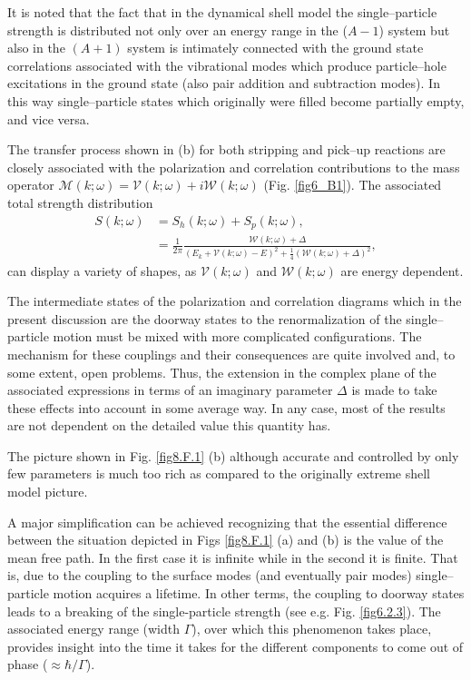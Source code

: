 It is noted that the fact that in the dynamical shell model the single--particle strength is distributed not only over an energy range in the ($A-1$) system but also in the $(A+1)$ system is intimately connected with the ground state correlations associated with the vibrational modes which produce particle--hole excitations in the ground state (also pair addition and subtraction modes). In this way single--particle states which originally were filled become partially empty, and vice versa.


The transfer process shown in (b) for both stripping and pick--up reactions are closely associated with the polarization and correlation contributions to the mass operator $\mathcal M(k;\omega)=\mathcal V(k;\omega)+i\mathcal W(k;\omega)$ (Fig. \ref{fig6_B1}). The associated total strength distribution
 \begin{align}
 \nonumber S(k;\omega)&=S_h(k;\omega)+S_p(k;\omega),\\
 &=\frac{1}{2\pi}\frac{\mathcal W(k;\omega)+\Delta}{(E_k+\mathcal V(k;\omega)-E)^2+\frac{1}{4}\left(\mathcal W(k;\omega)+\Delta\right)^2},
 \end{align}
can display a variety of shapes, as $\mathcal V(k;\omega)$ and $\mathcal W(k;\omega)$ are energy dependent.


The intermediate states of the polarization and correlation diagrams which in the present discussion are the doorway states to the renormalization of the single--particle motion must be mixed with more complicated configurations. The mechanism for these couplings and their consequences are quite involved and, to some extent, open problems. Thus, the extension in the complex plane of the associated expressions in terms of an imaginary parameter $\Delta$ is made to take these effects into account in some average way. In any case, most of the results are not dependent on the detailed value this quantity has. 


The picture shown in Fig. \ref{fig8.F.1} (b) although accurate and controlled by only few parameters is much too rich as compared to the originally extreme shell model picture.


A major simplification can be achieved recognizing that the essential difference between the situation depicted in Figs \ref{fig8.F.1} (a) and (b) is the value of the mean free path. In the first case it is infinite while in the second it is finite. That is, due to the coupling to the surface modes (and eventually pair modes) single--particle motion acquires a lifetime. In other terms, the coupling to doorway states leads to a breaking of the single-particle strength (see e.g. Fig. \ref{fig6.2.3}). The associated energy range (width $\Gamma$), over which this phenomenon takes place, provides insight into the time it takes for the different components to come out of phase ($\approx \hbar/\Gamma$). 

